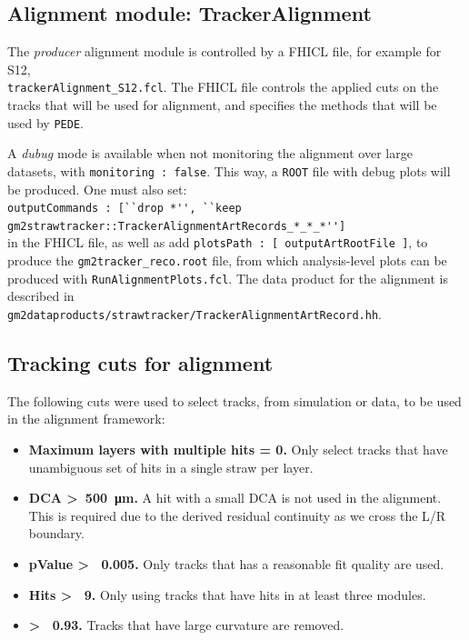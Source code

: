 \documentclass[12pt]{article}
\begin{document}
\subsection{Alignment module: TrackerAlignment} \label{sub:alignment_module}
The \textit{producer} alignment module is controlled by a FHICL file, for example for S12, \\\verb!trackerAlignment_S12.fcl!. The FHICL file controls the applied cuts on the tracks that will be used for alignment, and specifies the methods that will be used by \texttt{PEDE}.

A \textit{dubug} mode is available when not monitoring the alignment over large datasets, with \verb!monitoring : false!. This way, a \verb!ROOT! file with debug plots will be produced. One must also set: \\
\lstinline{outputCommands : [``drop *'', ``keep gm2strawtracker::TrackerAlignmentArtRecords_*_*_*'']} \\
in the FHICL file, as well as add \lstinline{plotsPath : [ outputArtRootFile ]}, to produce the \verb!gm2tracker_reco.root! file, from which analysis-level plots can be produced with \verb!RunAlignmentPlots.fcl!. The data product for the alignment is described in \\ \verb!gm2dataproducts/strawtracker/TrackerAlignmentArtRecord.hh!.   

\subsection{Tracking cuts for alignment}
The following cuts were used to select tracks, from simulation or data, to be used in the alignment framework:
\begin{itemize}\setlength\itemsep{0.05em}\small
    \item \textbf{Maximum layers with multiple hits = 0.} Only select tracks that have unambiguous set of hits in a single straw per layer. 
    \item \textbf{DCA \textgreater~\SI{500}{\micro\metre}.} A hit with a small DCA is not used in the alignment. This is required due to the derived residual continuity as we cross the L/R boundary.
    \item \textbf{pValue \textgreater~ 0.005.} Only tracks that has a reasonable fit quality are used. 
    \item \textbf{Hits \textgreater~ 9.} Only using tracks that have hits in at least three modules. 
    \item \textbf{ \textgreater~ 0.93.} Tracks that have large curvature are removed.
\end{itemize}
\end{document}
